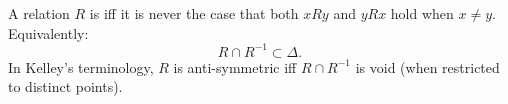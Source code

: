 A relation $R$ is  iff it is never the case that both $xRy$ and $yRx$ hold when $x \neq y$. Equivalently:
$$
R \cap R^{-1} \subset \Delta.
$$
In Kelley's terminology, $R$ is anti-symmetric iff $R \cap R^{-1}$ is void (when restricted to distinct points).
